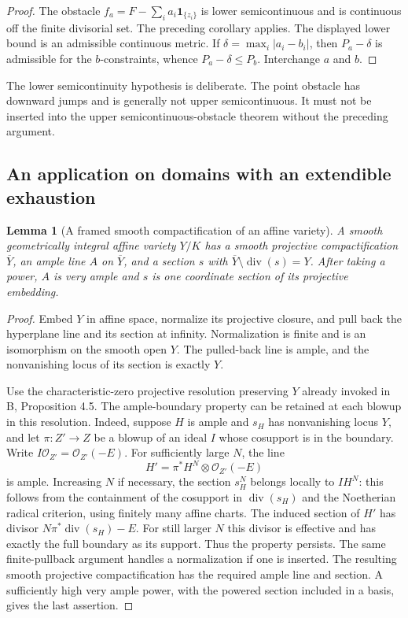 \documentclass[11pt,a4paper]{article}
\numberwithin{equation}{section}
\newtheorem{lemma}[theorem]{Lemma}
\theoremstyle{definition}
\theoremstyle{remark}
\begin{document}
\begin{proof}
The obstacle $f_a=F-\sum_i a_i\mathbf1_{\{z_i\}}$ is lower
semicontinuous and is continuous off the finite divisorial set.
The preceding corollary applies. The displayed lower bound is an
admissible continuous metric. If $\delta=\max_i|a_i-b_i|$, then
$P_a-\delta$ is admissible for the $b$-constraints, whence
$P_a-\delta\leq P_b$. Interchange $a$ and $b$.
\end{proof}

The lower semicontinuity hypothesis is deliberate. The point
obstacle has downward jumps and is generally not upper
semicontinuous. It must not be inserted into the upper
semicontinuous-obstacle theorem without the preceding argument.

\subsection{An application on domains with an extendible exhaustion}

\begin{lemma}[A framed smooth compactification of an affine variety]
\label{lem:r3-framed-compactification}
A smooth geometrically integral affine variety $Y/K$ has a smooth
projective compactification $\overline Y$, an ample line $A$ on
$\overline Y$, and a section $s$ with
$\overline Y\setminus\operatorname{div}(s)=Y$.
After taking a power, $A$ is very ample and $s$ is one coordinate
section of its projective embedding.
\end{lemma}

\begin{proof}
Embed $Y$ in affine space, normalize its projective closure, and
pull back the hyperplane line and its section at infinity.
Normalization is finite and is an isomorphism on the smooth open
$Y$. The pulled-back line is ample, and the nonvanishing locus of
its section is exactly $Y$.

Use the characteristic-zero projective resolution preserving $Y$
already invoked in B, Proposition 4.5. The ample-boundary property
can be retained at each blowup in this resolution. Indeed, suppose
$H$ is ample and $s_H$ has nonvanishing locus $Y$, and let
$\pi:Z'\to Z$ be a blowup of an ideal $I$ whose cosupport is in
the boundary. Write $I\mathcal O_{Z'}=\mathcal O_{Z'}(-E)$.
For sufficiently large $N$, the line
\[
 H'=\pi^*H^N\otimes\mathcal O_{Z'}(-E)
\]
is ample. Increasing $N$ if necessary, the section $s_H^N$
belongs locally to $I H^N$: this follows from the containment
of the cosupport in $\operatorname{div}(s_H)$ and the
Noetherian radical criterion, using finitely many affine charts.
The induced section of $H'$ has divisor
$N\pi^*\operatorname{div}(s_H)-E$. For still larger $N$ this
divisor is effective and has exactly the full boundary as its
support. Thus the property persists. The same finite-pullback
argument handles a normalization if one is inserted. The
resulting smooth projective compactification has the required
ample line and section. A sufficiently high very ample power,
with the powered section included in a basis, gives the last
assertion.
\end{proof}
\end{document}
